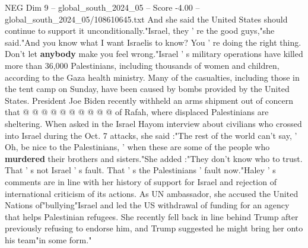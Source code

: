 \begin{textsample}{NEG Dim 9 – global\_south\_2024\_05 – Score -4.00 – global\_south\_2024\_05/108610645.txt}
And she said the United States should continue to support it unconditionally."Israel, they ' re the good guys,"she said."And you know what I want Israelis to know?
You ' re doing the right thing.
Don't let \textbf{anybody} make you feel wrong."Israel ' s military operations have killed more than 36,000 Palestinians, including thousands of women and children, according to the Gaza health ministry.
Many of the casualties, including those in the tent camp on Sunday, have been caused by bombs provided by the United States.
President Joe Biden recently withheld an arms shipment out of concern that @ @ @ @ @ @ @ @ @ @ of Rafah, where displaced Palestinians are sheltering.
When asked in the Israel Hayom interview about civilians who crossed into Israel during the Oct. 7 attacks, she said :"The rest of the world can't say, ' Oh, be nice to the Palestinians, ' when these are some of the people who \textbf{murdered} their brothers and sisters."She added :"They don't know who to trust.
That ' s not Israel ' s fault.
That ' s the Palestinians ' fault now."Haley ' s comments are in line with her history of support for Israel and rejection of international criticism of its actions.
As UN ambassador, she accused the United Nations of"bullying"Israel and led the US withdrawal of funding for an agency that helps Palestinian refugees.
She recently fell back in line behind Trump after previously refusing to endorse him, and Trump suggested he might bring her onto his team"in some form."

\end{textsample}

